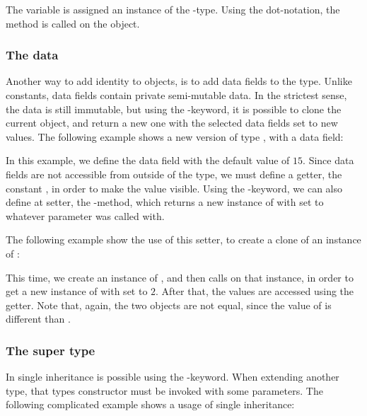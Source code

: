 
The variable  is assigned an instance of the -type. Using
the dot-notation, the method  is called on the object.

\subsubsection{The data}

Another way to add identity to objects, is to add data fields to the type.
Unlike constants, data fields contain private semi-mutable data. In the
strictest sense, the data is still immutable, but using the
-keyword, it is possible to clone the current object, and return a
new one with the selected data fields set to new values. The following example
shows a new version of type , with a data field:


In this example, we define the data field  with the default value
of $15$. Since data fields are not accessible from outside of the type, we must
define a getter, the constant , in order to make the value
visible. Using the -keyword, we can also define at setter, the
-method, which returns a new instance of  with
 set to whatever parameter  was called with.

The following example show the use of this setter, to create a clone of an
instance of :


This time, we create an instance of , and then calls 
on that instance, in order to get a new instance of  with 
set to $2$. After that, the values are accessed using the getter. Note that,
again, the two objects are not equal, since the value of  is
different than .

\subsubsection{The super type}

In \productname{} single inheritance is possible using the
-keyword. When extending another type, that types constructor
must be invoked with some parameters. The following complicated example shows a
usage of single inheritance:


